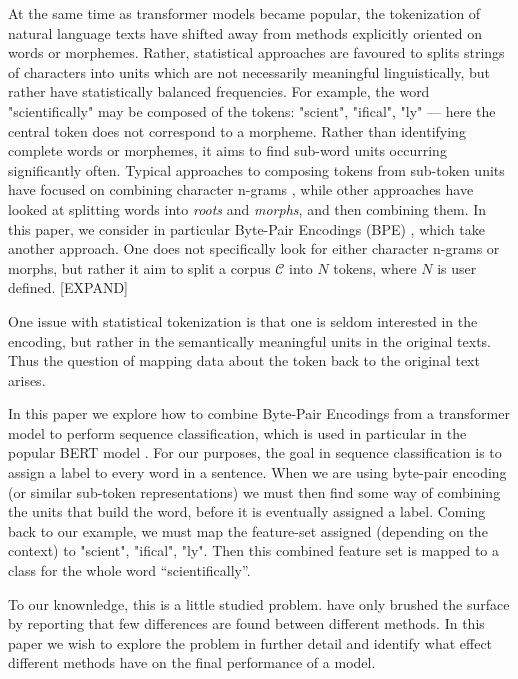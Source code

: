 \documentclass[11pt]{article}
\begin{document}
	At the same time as transformer models became popular, the
        tokenization of natural language texts have shifted away from
        methods explicitly oriented on words or morphemes. Rather,
        statistical approaches are favoured to splits strings of
        characters into units which are not necessarily meaningful
        linguistically, but rather have statistically balanced
        frequencies. For example, the word "scientifically" may be
        composed of the tokens: "scient", "ifical", "ly" --- here the
        central token does not correspond to a morpheme.
        Rather than identifying complete words or morphemes, it aims
        to find sub-word units occurring significantly often. Typical
        approaches to composing tokens from sub-token units have
        focused on combining character n-grams \cite{TODO:bojanowski},
        while other approaches have looked at splitting words into
        \textit{roots} and \textit{morphs}, and then
        combining them. In this paper, we consider in particular
        Byte-Pair Encodings (BPE) \citep{sennrich2015neural}, which take another approach. One does not
        specifically look for either character n-grams or morphs, but
        rather it aim to split a corpus $\mathcal{C}$ into $N$ tokens,
        where $N$ is user defined. [EXPAND]

        One issue with statistical tokenization is that one is seldom
        interested in the encoding, but rather in the semantically
        meaningful units in the original texts. Thus the question of
        mapping data about the token back to the original text arises.

	In this paper we explore how to combine Byte-Pair Encodings
        from a transformer model to perform sequence
        classification, which is used in particular in the popular BERT model \citep{devlin2018bert}. For our purposes, the goal in sequence
        classification is to assign a label to every word in a
        sentence. When we are using byte-pair encoding (or similar
        sub-token representations) we must then find some way of
        combining the units that build the word, before it is
        eventually assigned a label. Coming back to our example, we
        must map the feature-set assigned (depending on the context)
        to "scient", "ifical", "ly". Then this combined feature set is
        mapped to a class for the whole word ``scientifically''.

	To our knownledge, this is a little studied
        problem. \citet{todo} have only brushed the surface by
        reporting that few differences are found between different
        methods. In this paper we wish to explore the problem in
        further detail and identify what effect different methods have
        on the final performance of a model.
\end{document}

